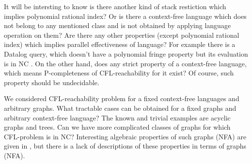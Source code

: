 \documentclass[smallextended]{svjour3}       %
\begin{document}
It will be intersting to know is there another kind of stack restiction which implies polynomial rational index? Or is there a context-free language which does not belong to any mentioned class and is not obtained by applying language operation on them? Are there any other properties (except polynomial rational index) which implies parallel effectiveness of language? For example there is a Datalog query, which doesn't have a polynomial fringe property but its evaluation is in NC \cite{Kanellakis}. On the other hand, does any strict property of a context-free language, which means P-completeness of CFL-reachability for it exist? Of course, such property should be undecidable.


We considered CFL-reachability problem for a fixed context-free languages and arbitrary graphs. What tractable cases can be obtained for a fixed graphs and arbitrary context-free language? The known and trivial examples are acyclic graphs and trees. Can we have more complicated classes of graphs for which CFL-problem is in NC? Interesting algebraic properties of such graphs (NFA) are given in \cite{ganardi2016circuit}, but there is a lack of descriptions of these properties in terms of graphs (NFA). 




%
%



%
%
\end{document}
